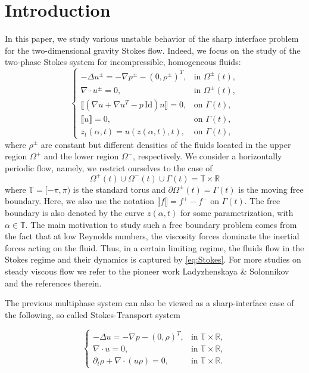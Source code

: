 \documentclass[11pt]{article}
\numberwithin{equation}{section}
\newcommand{\T}{\mathbb{T}}
\begin{document}
\section{Introduction}
In this paper, we study various unstable behavior of the sharp interface problem for the two-dimensional gravity Stokes flow. Indeed, we focus on the study of the two-phase Stokes system for incompressible, homogeneous fluids: 
\begin{equation}\label{eq:Stokes}
    \begin{cases}
        -\Delta u^{\pm} = -\nabla p^\pm - (0,\rho^\pm)^T,&\text{in }\Omega^\pm(t),\\
        \nabla\cdot u^\pm = 0,&\text{in }\Omega^\pm(t),\\
        \llbracket(\nabla u + \nabla u^T - p \, \text{Id})n\rrbracket = 0,&\text{on }\Gamma(t),\\
        \llbracket u \rrbracket = 0,&\text{on }\Gamma(t),\\
        z_t(\alpha,t) = u(z(\alpha,t),t),&\text{on }\Gamma(t),
    \end{cases}
\end{equation}
where $\rho^\pm$ are constant but different densities of the fluids located in the upper region 
$\Omega^+$ and the lower region $\Omega^-$, respectively. We consider a horizontally periodic flow, namely, we restrict ourselves to the case of
$$
\Omega^+(t)\cup\Omega^-(t)\cup\Gamma(t)=\mathbb{T}\times \mathbb{R}
$$
where $\T = [-\pi, \pi)$ is the standard torus and $\partial\Omega^{\pm}(t)=\Gamma(t)$ is the moving free boundary. Here, we also use the notation $\llbracket f \rrbracket = f^+ - f^-$ on $\Gamma(t)$. The free boundary is also denoted by the curve $z(\alpha,t)$ for some parametrization, with $\alpha \in \mathbb{T}$. The main motivation to study such a free boundary problem comes from the fact that at low Reynolds numbers, the viscosity forces dominate the inertial forces acting on the fluid. Thus, in a certain limiting regime, the fluids flow in the Stokes regime and their dynamics is captured by \eqref{eq:Stokes}. For more studies on steady viscous flow we refer to the pioneer work Ladyzhenskaya \& Solonnikov \cite{ladyzhenskaya1983determination} and the references therein.

The previous multiphase system can also be viewed as a sharp-interface case of the following, so called Stokes-Transport system \cite{hofer2025sedimentation}

\begin{equation}\label{eq:StokesTr}
    \begin{cases}
        -\Delta u= -\nabla p - (0,\rho)^T,&\text{in }\mathbb{T}\times \mathbb{R},\\
        \nabla\cdot u = 0,&\text{in }\mathbb{T}\times \mathbb{R},\\
\partial_t \rho+\nabla\cdot(u\rho)=0, &\text{in }\mathbb{T}\times \mathbb{R}.   \end{cases}
\end{equation}
\end{document}

